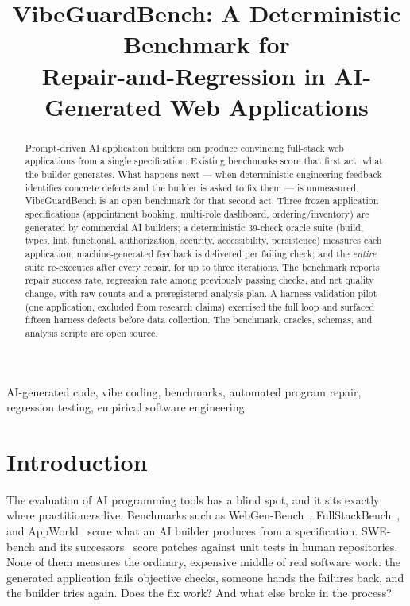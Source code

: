\documentclass[conference]{IEEEtran}
\begin{document}
\title{VibeGuardBench: A Deterministic Benchmark for \\ Repair-and-Regression in AI-Generated Web Applications}

\author{
}

\maketitle

\begin{abstract}
Prompt-driven AI application builders can produce convincing full-stack web
applications from a single specification. Existing benchmarks score that first
act: what the builder generates. What happens next --- when deterministic
engineering feedback identifies concrete defects and the builder is asked to fix
them --- is unmeasured. VibeGuardBench is an open benchmark for that second act.
Three frozen application specifications (appointment booking, multi-role
dashboard, ordering/inventory) are generated by commercial AI builders; a
deterministic 39-check oracle suite (build, types, lint, functional, authorization,
security, accessibility, persistence) measures each application; machine-generated
feedback is delivered per failing check; and the \emph{entire} suite re-executes
after every repair, for up to three iterations. The benchmark reports repair
success rate, regression rate among previously passing checks, and net quality
change, with raw counts and a preregistered analysis plan. A harness-validation
pilot (one application, excluded from research claims) exercised the full loop and
surfaced fifteen harness defects before data collection. The benchmark, oracles,
schemas, and analysis scripts are open source.
\end{abstract}

\begin{IEEEkeywords}
AI-generated code, vibe coding, benchmarks, automated program repair, regression testing, empirical software engineering
\end{IEEEkeywords}

\section{Introduction}
The evaluation of AI programming tools has a blind spot, and it sits exactly where
practitioners live. Benchmarks such as WebGen-Bench~\cite{lu2025webgen},
FullStackBench~\cite{byte2025fullstack}, and AppWorld~\cite{trivedi2024appworld}
score what an AI builder produces from a specification. SWE-bench and its
successors~\cite{jimenez2024swebench} score patches against unit tests in human
repositories. None of them measures the ordinary, expensive middle of real
software work: the generated application fails objective checks, someone hands the
failures back, and the builder tries again. Does the fix work? And what else broke
in the process?
\end{document}
